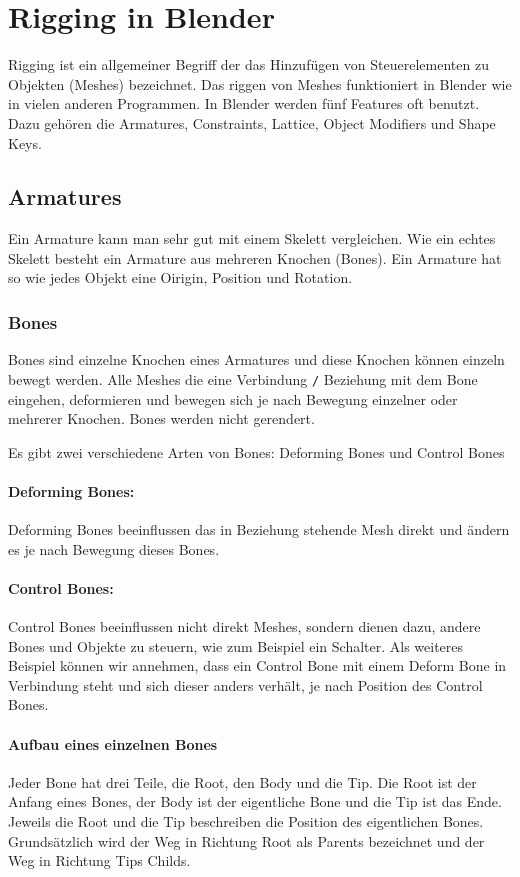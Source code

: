 \section{Rigging in Blender}
Rigging ist ein allgemeiner Begriff der das Hinzufügen von Steuerelementen zu Objekten (Meshes) bezeichnet.
Das riggen von Meshes funktioniert in Blender wie in vielen anderen Programmen.
In Blender werden fünf Features oft benutzt. Dazu gehören die Armatures, Constraints, Lattice, Object Modifiers und Shape Keys.
\citep{Blender:rigging}

\subsection{Armatures}
Ein Armature kann man sehr gut mit einem Skelett vergleichen.
Wie ein echtes Skelett besteht ein Armature aus mehreren Knochen (Bones). Ein Armature hat so wie jedes Objekt eine Oirigin,
Position und Rotation.
\citep{Blender:armature}

\subsubsection{Bones}
Bones sind einzelne Knochen eines Armatures und diese Knochen können einzeln bewegt werden.
Alle Meshes die eine Verbindung \verb-/- Beziehung mit dem Bone eingehen, deformieren und bewegen sich je nach Bewegung einzelner oder mehrerer Knochen. Bones werden nicht gerendert.
\citep{Blender:bones}

Es gibt zwei verschiedene Arten von Bones: Deforming Bones und Control Bones

\paragraph{Deforming Bones:}
Deforming Bones beeinflussen das in Beziehung stehende Mesh direkt und ändern es je nach Bewegung dieses Bones.

\paragraph{Control Bones:}
Control Bones beeinflussen nicht direkt Meshes, sondern dienen dazu, andere Bones und Objekte zu steuern, wie zum Beispiel ein Schalter.
Als weiteres Beispiel können wir annehmen, dass ein Control Bone mit einem Deform Bone in Verbindung steht und sich dieser anders verhält, je nach Position des Control Bones.

\paragraph{Aufbau eines einzelnen Bones}
Jeder Bone hat drei Teile, die Root, den Body und die Tip. Die Root ist der Anfang eines Bones, der Body ist der eigentliche Bone und die Tip ist das Ende.
Jeweils die Root und die Tip beschreiben die Position des eigentlichen Bones.
Grundsätzlich wird der Weg in Richtung Root als Parents bezeichnet und der Weg in Richtung Tips Childs.
\citep{Blender:bonesAufbau}

